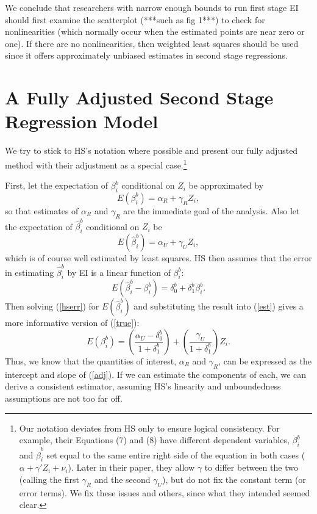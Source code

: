 \documentclass[11pt,titlepage]{article}
\begin{document}
We conclude that researchers with narrow enough bounds to run first
stage EI should first examine the scatterplot (***such as fig 1***) to
check for nonlinearities (which normally occur when the estimated
points are near zero or one).  If there are no nonlinearities, then
weighted least squares should be used since it offers approximately
unbiased estimates in second stage regressions.

\section{A Fully Adjusted Second Stage Regression Model}
\label{s:fulladj}

We try to stick to HS's notation where possible and present our fully
adjusted method with their adjustment as a special case.\footnote{Our
  notation deviates from HS only to ensure logical consistency.  For
  example, their Equations (7) and (8) have different dependent
  variables, $\beta_i^b$ and $\hat\beta_i^b$ set equal to the same
  entire right side of the equation in both cases
  ($\alpha+\gamma'Z_i+\nu_i$).  Later in their paper, they allow
  $\gamma$ to differ between the two (calling the first $\gamma_R$ and
  the second $\gamma_U$), but do not fix the constant term (or error
  terms).  We fix these issues and others, since what they intended
  seemed clear.}

First, let the expectation of $\beta_i^b$ conditional on $Z_i$ be
approximated by
\begin{equation}
  \label{true}
  E(\beta_i^b)=\alpha_R+\gamma_R Z_i,
\end{equation}
so that estimates of $\alpha_R$ and $\gamma_R$ are the immediate goal
of the analysis.  Also let the expectation of $\hat\beta_i^b$
conditional on $Z_i$ be
\begin{equation}
  \label{est}
  E(\hat\beta_i^b)=\alpha_U+\gamma_U Z_i,
\end{equation}
which is of course well estimated by least squares.  HS then assumes
that the error in estimating $\hat\beta_i^b$ by EI is a linear
function of $\beta_i^b$:
\begin{equation}
  \label{hserr}
  E(\hat\beta_i^b - \beta_i^b) = \delta_0^b + \delta_1^b\beta_i^b.
\end{equation}
Then solving (\ref{hserr}) for $E(\hat\beta_i^b)$ and substituting the
result into (\ref{est}) gives a more informative version of (\ref{true}):
\begin{equation}
  \label{adj}
  E(\beta_i^b) = \left(\frac{\alpha_U-\delta_0^b}{1+\delta_1^b}\right)
  + \left(\frac{\gamma_U}{1+\delta_1^b}\right)Z_i.
\end{equation}
Thus, we know that the quantities of interest, $\alpha_R$ and
$\gamma_R$, can be expressed as the intercept and slope of
(\ref{adj}).  If we can estimate the components of each, we can derive
a consistent estimator, assuming HS's linearity and unboundedness
assumptions are not too far off.
\end{document}
